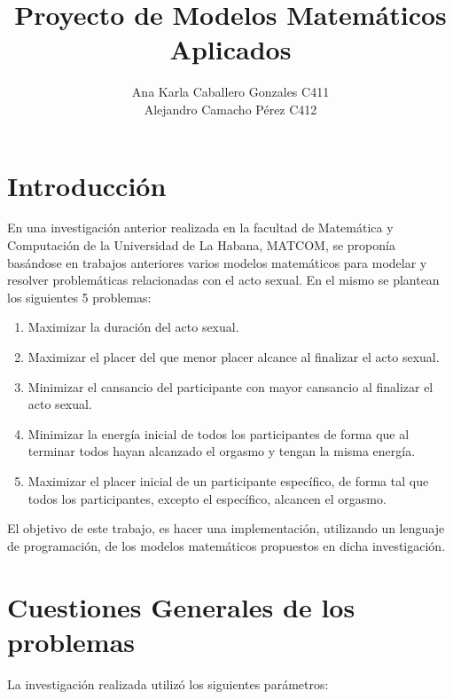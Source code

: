 \documentclass[12pt]{article}
\begin{document}
\title{Proyecto de Modelos Matemáticos Aplicados }
\author{Ana Karla Caballero Gonzales C411 \\ Alejandro Camacho Pérez C412}

\date{}

\maketitle
\tableofcontents
\newpage


\section{Introducción}
En una investigación anterior realizada en la facultad de Matemática y Computación de la Universidad de La Habana, MATCOM, se proponía basándose en trabajos anteriores varios modelos matemáticos para modelar y resolver problemáticas relacionadas con el acto sexual. En el mismo se plantean los siguientes 5 problemas:

\begin{enumerate}
    \item Maximizar la duración del acto sexual.
    \item Maximizar el placer del que menor placer alcance al finalizar el acto sexual.
    \item Minimizar el cansancio del participante con mayor cansancio al finalizar el acto sexual.
    \item Minimizar la energía inicial de todos los participantes de forma que al terminar todos hayan alcanzado el orgasmo y tengan la misma energía.
    \item Maximizar el placer inicial de un participante específico, de forma tal que todos los participantes, excepto el específico, alcancen el orgasmo.
\end{enumerate}

El objetivo de este trabajo, es hacer una implementación, utilizando un lenguaje de programación, de los modelos matemáticos propuestos en dicha investigación.

\section{Cuestiones Generales de los problemas}

La investigación realizada utilizó los siguientes parámetros:
\end{document}
